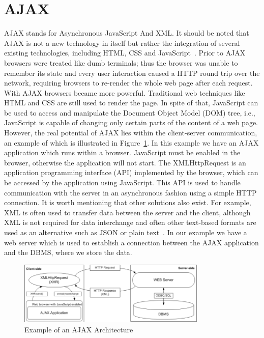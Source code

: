 \section{AJAX}
\label{sec:ajax}
AJAX stands for Asynchronous JavaScript And XML. It should be noted
that AJAX is not a new technology in itself but rather the integration of several 
existing technologies, including HTML, CSS and JavaScript~\cite{w3}. Prior to AJAX browsers 
were treated 
like dumb terminals; thus the browser was unable to remember its state and every 
user interaction caused a HTTP round trip over the network, requiring browsers 
to re-render the whole web page after each request. With AJAX browsers became 
more powerful. Traditional web techniques like HTML and CSS are still used to 
render the page. In spite of that, JavaScript can be used to access 
and manipulate the Document Object Model (DOM) tree, i.e., 
JavaScript is capable of changing only certain parts
of the content of a web page. However, the
real potential of AJAX lies within the client-server communication, an example
of which is illustrated in Figure~\ref{fig:ajax01}. In this example we have an AJAX application
which runs within a browser. JavaScript must be enabled in the browser, otherwise
the application will not start.  
The XMLHttpRequest is an application programming interface (API) implemented by the browser,
which can be accessed by the application using JavaScript. This API is 
used to handle communication with the server in an asynchronous fashion using a
simple HTTP connection. It is worth mentioning that other solutions also exist. 
For example, XML is often used to transfer data between the server and the client, 
although XML is not required for data interchange and often other text-based
formats are used as an alternative such as JSON or plain text~\cite{bajax1}. In our example we have 
a web server which is used to establish a connection between the AJAX application and
the DBMS, where we store the data.

\begin{figure}[h]
	\begin{center}
		\includegraphics[width=0.8\textwidth]{./img/ajax01a.png}
		\caption{Example of an AJAX Architecture}
		\label{fig:ajax01}
	\end{center}
\end{figure}

